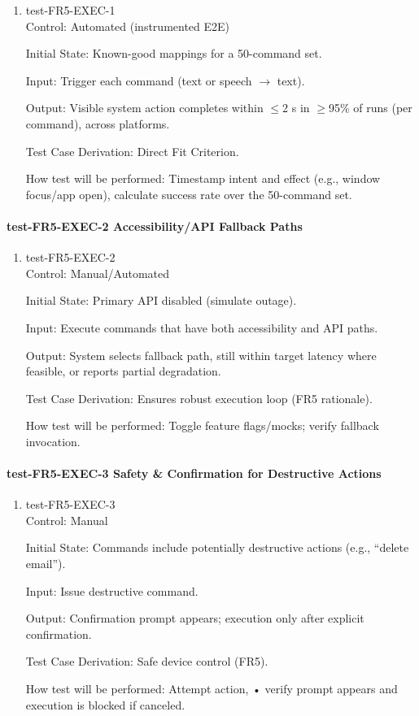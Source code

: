 \documentclass[12pt, titlepage]{article}
\begin{document}
\begin{enumerate}
\item{test-FR5-EXEC-1\\}
Control: Automated (instrumented E2E)

Initial State: Known-good mappings for a 50-command set.

Input: Trigger each command (text or speech $\rightarrow$ text).

Output: Visible system action completes within $\leq$2 s in $\geq$95\% of runs (per command), across platforms.

Test Case Derivation: Direct Fit Criterion.

How test will be performed: Timestamp intent and effect (e.g., window focus/app open), calculate success rate over the 50-command set.
\end{enumerate}

\paragraph{test-FR5-EXEC-2 Accessibility/API Fallback Paths}

\begin{enumerate}
\item{test-FR5-EXEC-2\\}
Control: Manual/Automated

Initial State: Primary API disabled (simulate outage).

Input: Execute commands that have both accessibility and API paths.

Output: System selects fallback path, still within target latency where feasible, or reports partial degradation.

Test Case Derivation: Ensures robust execution loop (FR5 rationale).

How test will be performed: Toggle feature flags/mocks; verify fallback invocation.
\end{enumerate}

\paragraph{test-FR5-EXEC-3 Safety \& Confirmation for Destructive Actions}

\begin{enumerate}
\item{test-FR5-EXEC-3\\}
Control: Manual

Initial State: Commands include potentially destructive actions (e.g., “delete email”).

Input: Issue destructive command.

Output: Confirmation prompt appears; execution only after explicit confirmation.

Test Case Derivation: Safe device control (FR5).

How test will be performed: Attempt action, 
• verify prompt appears and execution is blocked if canceled.
\end{enumerate}
\end{document}
